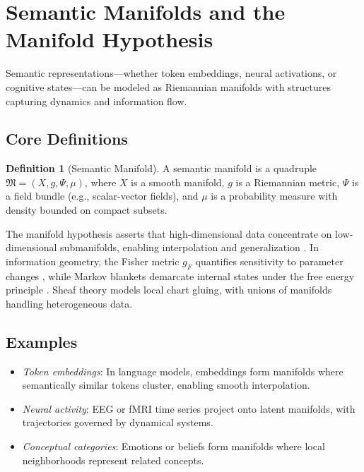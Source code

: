 \documentclass{article}
\theoremstyle{definition}
\newtheorem{definition}{Definition}[section]
\begin{document}
\section{Semantic Manifolds and the Manifold Hypothesis}
Semantic representations—whether token embeddings, neural activations, or cognitive states—can be modeled as Riemannian manifolds with structures capturing dynamics and information flow.

\subsection{Core Definitions}
\begin{definition}[Semantic Manifold]
A semantic manifold is a quadruple $\mathfrak{M} = (X, g, \Psi, \mu)$, where $X$ is a smooth manifold, $g$ is a Riemannian metric, $\Psi$ is a field bundle (e.g., scalar-vector fields), and $\mu$ is a probability measure with density bounded on compact subsets.
\end{definition}

The manifold hypothesis \cite{fefferman2016testing,gorban2018blessing} asserts that high-dimensional data concentrate on low-dimensional submanifolds, enabling interpolation and generalization \cite{chollet2021deep}. In information geometry, the Fisher metric $g_F$ quantifies sensitivity to parameter changes \cite{caticha2015geometry}, while Markov blankets demarcate internal states under the free energy principle \cite{kirchhoff2018markov}. Sheaf theory models local chart gluing, with unions of manifolds \cite{brown2023union} handling heterogeneous data.

\subsection{Examples}
\begin{itemize}
  \item \emph{Token embeddings}: In language models, embeddings form manifolds where semantically similar tokens cluster, enabling smooth interpolation.
  \item \emph{Neural activity}: EEG or fMRI time series project onto latent manifolds, with trajectories governed by dynamical systems.
  \item \emph{Conceptual categories}: Emotions or beliefs form manifolds where local neighborhoods represent related concepts.
\end{itemize}
\end{document}
